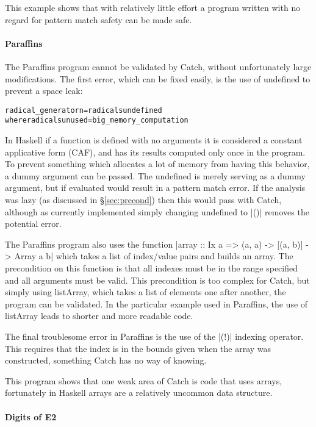 \documentclass[preprint]{sigplanconf}
\newcommand{\C}[1]{\textsf{#1}}
\newenvironment{code}{\begin{alltt}\small}{\end{alltt}}
\begin{document}
This example shows that with relatively little effort a program written with no regard for pattern match safety can be made safe.

\paragraph{Paraffins}

The Paraffins program cannot be validated by Catch, without unfortunately large modifications. The first error, which can be fixed easily, is the use of undefined to prevent a space leak:

\begin{code}
radical_generator n = radicals undefined
  where radicals unused = big_memory_computation
\end{code}

In Haskell if a function is defined with no arguments it is considered a constant applicative form (CAF), and has its results computed only once in the program. To prevent something which allocates a lot of memory from having this behavior, a dummy argument can be passed. The \C{undefined} is merely serving as a dummy argument, but if evaluated would result in a pattern match error. If the analysis was lazy (as discussed in \S\ref{sec:precond}) then this would pass with Catch, although as currently implemented simply changing \C{undefined} to |()| removes the potential error.

The Paraffins program also uses the function |array :: Ix a => (a, a) -> [(a, b)] -> Array a b| which takes a list of index/value pairs and builds an array. The precondition on this function is that all indexes must be in the range specified and all arguments must be valid. This precondition is too complex for Catch, but simply using \C{listArray}, which takes a list of elements one after another, the program can be validated. In the particular example used in Paraffins, the use of \C{listArray} leads to shorter and more readable code.

The final troublesome error in Paraffins is the use of the |(!)| indexing operator. This requires that the index is in the bounds given when the array was constructed, something Catch has no way of knowing.

This program shows that one weak area of Catch is code that uses arrays, fortunately in Haskell arrays are a relatively uncommon data structure.

\paragraph{Digits of E2}
\end{document}
